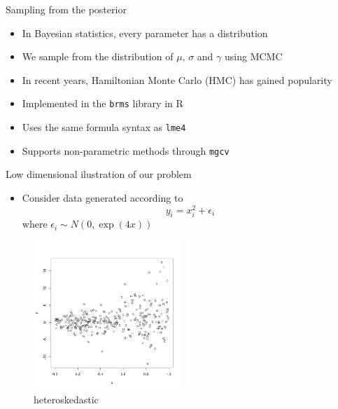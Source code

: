 \begin{frame}{Sampling from the posterior}
\protect\hypertarget{sampling-from-the-posterior}{}
\begin{itemize}
\tightlist
\item
  In Bayesian statistics, every parameter has a distribution
\item
  We sample from the distribution of \(\mu\), \(\sigma\) and \(\gamma\)
  using MCMC
\item
  In recent years, Hamiltonian Monte Carlo (HMC) has gained popularity
\item
  Implemented in the \lstinline!brms! library in R
\item
  Uses the same formula syntax as \lstinline!lme4!
\item
  Supports non-parametric methods through \lstinline!mgcv!
\end{itemize}
\end{frame}

\begin{frame}{Low dimensional ilustration of our problem}
\protect\hypertarget{low-dimensional-ilustration-of-our-problem}{}
\begin{itemize}
\tightlist
\item
  Consider data generated according to\\
  \begin{equation*}
   y_i = x_i^2 + \epsilon_i
   \end{equation*} where \(\epsilon_i \sim N(0, \exp(4x))\)
\end{itemize}

\begin{figure}
\centering
\includegraphics[width=0.5\textwidth,height=\textheight]{code_by_nico/functional/slides/htskdata.png}
\caption{heteroskedastic}
\end{figure}
\end{frame}

